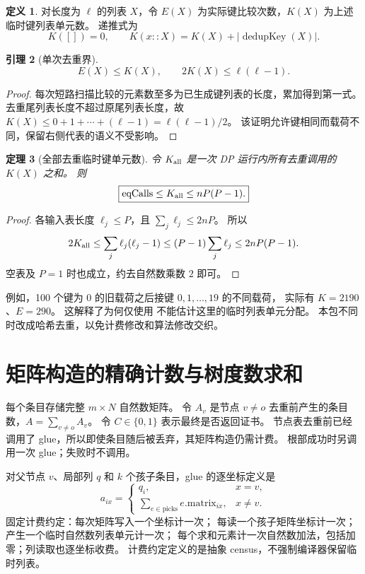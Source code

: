 \documentclass[UTF8,11pt,a4paper]{ctexart}
\newtheorem{theorem}{定理}[section]
\newtheorem{lemma}[theorem]{引理}
\theoremstyle{definition}
\newtheorem{definition}[theorem]{定义}
\newcommand{\abs}[1]{\left|#1\right|}
\newcommand{\code}[1]{\texttt{\detokenize{#1}}}
\begin{document}
\begin{definition}
对长度为 $\ell$ 的列表 $X$，令 $E(X)$ 为实际键比较次数，$K(X)$ 为上述临时键列表单元数。
递推式为
\[
 K([])=0,\qquad K(x::X)=K(X)+\abs{\operatorname{dedupKey}(X)}.
\]
\end{definition}
\begin{lemma}[单次去重界]
\[
 E(X)\le K(X),\qquad 2K(X)\le\ell(\ell-1).
\]
\end{lemma}
\begin{proof}
每次短路扫描比较的元素数至多为已生成键列表的长度，累加得到第一式。
去重尾列表长度不超过原尾列表长度，故
$K(X)\le0+1+\cdots+(\ell-1)=\ell(\ell-1)/2$。
该证明允许键相同而载荷不同，保留右侧代表的语义不受影响。
\end{proof}

\begin{theorem}[全部去重临时键单元数]\label{thm:keymap}
令 $K_{\rm all}$ 是一次 DP 运行内所有去重调用的 $K(X)$ 之和。
则
\[
 \boxed{\mathrm{eqCalls}\le K_{\rm all}\le nP(P-1).}
\]
\end{theorem}
\begin{proof}
各输入表长度 $\ell_j\le P$，且 $\sum_j\ell_j\le2nP$。
所以
\[
 2K_{\rm all}\le\sum_j\ell_j(\ell_j-1)
 \le(P-1)\sum_j\ell_j\le2nP(P-1).
\]
空表及 $P=1$ 时也成立，约去自然数乘数 $2$ 即可。
\end{proof}
例如，100 个键为 $0$ 的旧载荷之后接键 $0,1,\dots,19$ 的不同载荷，
实际有 $K=2190$、$E=290$。
这解释了为何仅使用 \code{eqCalls} 不能估计这里的临时列表单元分配。
本包不同时改成哈希去重，以免计费修改和算法修改交织。

\section{矩阵构造的精确计数与树度数求和}
每个条目存储完整 $m\times N$ 自然数矩阵。
令 $A_v$ 是节点 $v\ne o$ 去重前产生的条目数，$A=\sum_{v\ne o}A_v$。
令 $C\in\{0,1\}$ 表示最终是否返回证书。
节点表去重前已经调用了 glue，所以即使条目随后被丢弃，其矩阵构造仍需计费。
根部成功时另调用一次 glue；失败时不调用。

对父节点 $v$、局部列 $q$ 和 $k$ 个孩子条目，glue 的逐坐标定义是
\[
 a_{ix}=
 \begin{cases}
  q_i,&x=v,\\
  \displaystyle\sum_{e\in\mathrm{picks}}e.\mathrm{matrix}_{ix},&x\ne v.
 \end{cases}
\]
固定计费约定：每次矩阵写入一个坐标计一次；
每读一个孩子矩阵坐标计一次；\code{map} 产生一个临时自然数列表单元计一次；
每个求和元素计一次自然数加法，包括加零；列读取也逐坐标收费。
计费约定定义的是抽象 census，不强制编译器保留临时列表。
\end{document}

